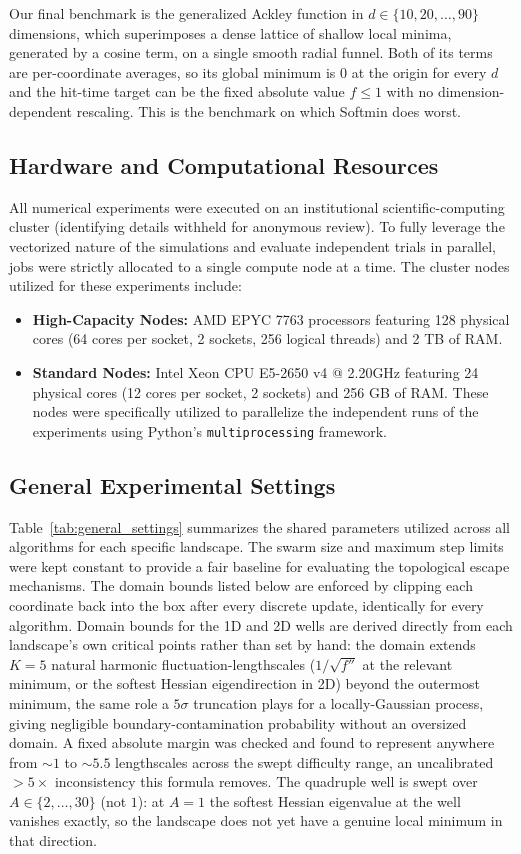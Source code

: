 \documentclass{opt2026} %
\begin{document}
Our final benchmark is the generalized Ackley function in $d\in\{10,20,\dots,90\}$ dimensions, which superimposes a dense lattice of shallow local minima, generated by a cosine term, on a single smooth radial funnel. Both of its terms are per-coordinate averages, so its global minimum is $0$ at the origin for every $d$ and the hit-time target can be the fixed absolute value $f\le1$ with no dimension-dependent rescaling. This is the benchmark on which Softmin does worst.

\subsection{Hardware and Computational Resources}
All numerical experiments were executed on an institutional scientific-computing cluster (identifying details withheld for anonymous review). To fully leverage the vectorized nature of the simulations and evaluate independent trials in parallel, jobs were strictly allocated to a single compute node at a time. The cluster nodes utilized for these experiments include:
\begin{itemize}
    \item \textbf{High-Capacity Nodes:} AMD EPYC 7763 processors featuring 128 physical cores (64 cores per socket, 2 sockets, 256 logical threads) and 2 TB of RAM.
    \item \textbf{Standard Nodes:} Intel Xeon CPU E5-2650 v4 @ 2.20GHz featuring 24 physical cores (12 cores per socket, 2 sockets) and 256 GB of RAM. These nodes were specifically utilized to parallelize the independent runs of the experiments using Python's \texttt{multiprocessing} framework.
\end{itemize}

\subsection{General Experimental Settings}
Table~\ref{tab:general_settings} summarizes the shared parameters utilized across all algorithms for each specific landscape. The swarm size and maximum step limits were kept constant to provide a fair baseline for evaluating the topological escape mechanisms. The domain bounds listed below are enforced by clipping each coordinate back into the box after every discrete update, identically for every algorithm. Domain bounds for the 1D and 2D wells are derived directly from each landscape's own critical points rather than set by hand: the domain extends $K=5$ natural harmonic fluctuation-lengthscales ($1/\sqrt{f''}$ at the relevant minimum, or the softest Hessian eigendirection in 2D) beyond the outermost minimum, the same role a $5\sigma$ truncation plays for a locally-Gaussian process, giving negligible boundary-contamination probability without an oversized domain. A fixed absolute margin was checked and found to represent anywhere from $\sim\!1$ to $\sim\!5.5$ lengthscales across the swept difficulty range, an uncalibrated $>\!5\times$ inconsistency this formula removes. The quadruple well is swept over $A\in\{2,\dots,30\}$ (not $1$): at $A=1$ the softest Hessian eigenvalue at the well vanishes exactly, so the landscape does not yet have a genuine local minimum in that direction.
\end{document}

